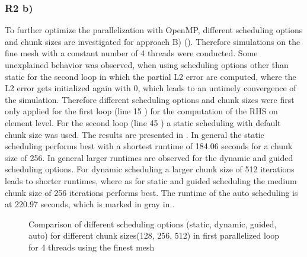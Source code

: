 \subsubsection{R2 b) \label{sec:Scheduling}}

To further optimize the parallelization with OpenMP, different scheduling options and chunk sizes are investigated for approach B) (). Therefore simulations on the fine mesh with a constant number of 4 threads were conducted. Some unexplained behavior was observed, when using scheduling options other than static for the second loop in which the partial L2 error are computed, where the L2 error gets initialized again with 0, which leads to an untimely convergence of the simulation. Therefore different scheduling options and chunk sizes were first only applied for the first loop (line 15 ) for the computation of the RHS on element level. For the second loop (line 45 ) a static scheduling with default chunk size was used. The results are presented in . 
In general the static scheduling performs best with a shortest runtime of 184.06 seconds for a chunk size of 256. In general larger runtimes are observed for the dynamic and guided scheduling options. For dynamic scheduling a larger chunk size of 512 iterations leads to shorter runtimes, where as for static and guided scheduling the medium chunk size of 256 iterations performs best. The runtime of the auto scheduling is at 220.97 seconds, which is marked in gray in .

\begin{figure}[h!]
	\centering
	\caption{\label{fig::Scheduling} Comparison of different scheduling options (static, dynamic, guided, auto) for different chunk sizes(128, 256, 512) in first parallelized loop for 4 threads using the finest mesh}
\end{figure}

